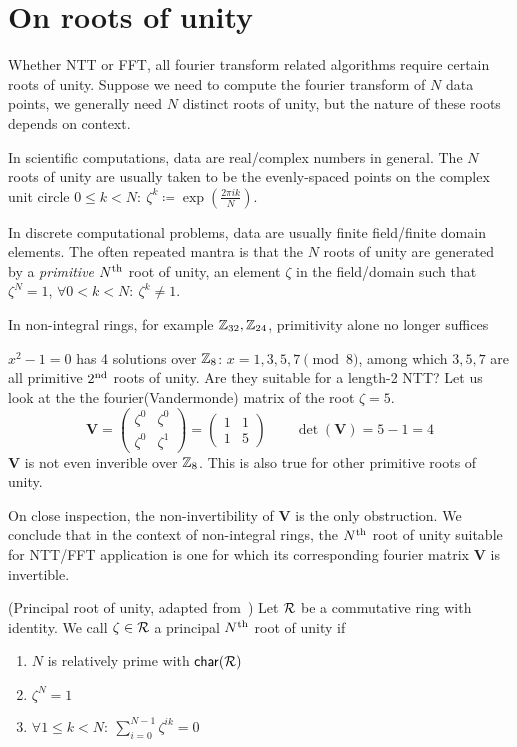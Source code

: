 \section{On roots of unity}
Whether NTT or FFT, all fourier transform related algorithms require certain roots of unity. Suppose we need to compute the fourier transform of \(N\) data points, we generally need \(N\) distinct roots of unity, but the nature of these roots depends on context.

In scientific computations, data are real/complex numbers in general. The \(N\) roots of unity are usually taken to be the evenly-spaced points on the complex unit circle \(0 \le k < N:\: \zeta^k \coloneq \exp{(\frac{2 \pi i k}{N})}\).

In discrete computational problems, data are usually finite field/finite domain elements. The often repeated mantra is that the \(N\) roots of unity are generated by a \emph{primitive} \(N\textsuperscript{th}\) root of unity, an element \(\zeta\) in the field/domain such that \(\zeta^N = 1\), \(\forall 0 < k < N:\: \zeta^k \neq 1\).

In non-integral rings, for example \(\mathbb{Z}_{32}, \mathbb{Z}_{24}\), primitivity alone no longer suffices
\begin{example}
    \(x^2 - 1 = 0\) has 4 solutions over \(\mathbb{Z}_8\): \(x = 1, 3, 5, 7 \pmod{8}\), among which \(3, 5, 7\) are all primitive \(2\textsuperscript{nd}\) roots of unity. Are they suitable for a length-2 NTT? Let us look at the the fourier(Vandermonde) matrix of the root \(\zeta = 5\).
    \[\bm{V} = \begin{pmatrix}
        \zeta^{0} & \zeta^{0} \\
        \zeta^{0} & \zeta^{1}
    \end{pmatrix} = \begin{pmatrix}
        1 & 1 \\
        1 & 5
    \end{pmatrix} \qquad \det{(\bm{V})} = 5 - 1 = 4\]
    \(\bm{V}\) is not even inverible over \(\mathbb{Z}_8\). This is also true for other primitive roots of unity.
\end{example}

On close inspection, the non-invertibility of \(\bm{V}\) is the only obstruction. We conclude that in the context of non-integral rings, the \(N\textsuperscript{th}\) root of unity suitable for NTT/FFT application is one for which its corresponding fourier matrix \(\bm{V}\) is invertible.

\begin{definition}{(Principal root of unity, adapted from~\cite{MISC:WikiRoot})} \label{def:PrincipalRoot}
    Let \(\mathcal{R}\) be a commutative ring with identity. We call \(\zeta \in \mathcal{R}\) a principal \(N\textsuperscript{th}\) root of unity if
    \begin{enumerate}
        \item \(N\) is relatively prime with \(\mathsf{char}(\mathcal{R})\)
        \item \(\zeta^N = 1\)
        \item \(\forall 1 \le k < N:\: \sum_{i=0}^{N-1}\zeta^{ik} = 0\)
    \end{enumerate}
\end{definition}

